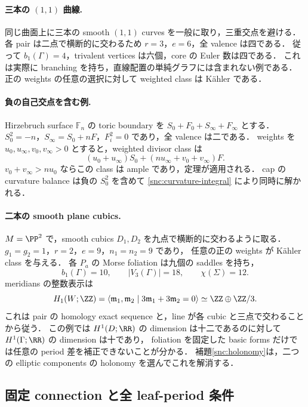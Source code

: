 \paragraph{三本の $(1,1)$ 曲線.}
同じ曲面上に三本の smooth $(1,1)$ curves を一般に取り，三重交点を避ける．
各 pair は二点で横断的に交わるため $r=3$，$e=6$，全 valence は四である．
従って $b_1(\Gamma)=4$，trivalent vertices は六個，core の Euler 数は四である．
これは実際に branching を持ち，直線配置の単純グラフには含まれない例である．
正の weights の任意の選択に対して weighted class は Kähler である．

\paragraph{負の自己交点を含む例.}
Hirzebruch surface $\mathbb F_n$ の toric boundary を
$S_0+F_0+S_\infty+F_\infty$ とする．
$S_0^2=-n$，$S_\infty=S_0+nF$，$F_i^2=0$ であり，全 valence は二である．
weights を $u_0,u_\infty,v_0,v_\infty>0$ とすると，weighted divisor class は
\[
 (u_0+u_\infty)S_0+(nu_\infty+v_0+v_\infty)F.
\]
$v_0+v_\infty>nu_0$ ならこの class は ample であり，定理が適用される．
cap の curvature balance は負の $S_0^2$ を含めて
\eqref{snc:curvature-integral} により同時に解かれる．


\paragraph{二本の smooth plane cubics.}
$M=\PP^2$ で，smooth cubics $D_1,D_2$ を九点で横断的に交わるように取る．
$g_1=g_2=1$，$r=2$，$e=9$，$n_1=n_2=9$ であり，
任意の正の weights が Kähler class を与える．
各 $P_a$ の Morse foliation は九個の saddles を持ち，
\[
 b_1(\Gamma)=10,\qquad |V_3(\Gamma)|=18,\qquad \chi(\Sigma)=12.
\]
meridians の整数表示は
\[
 H_1(W;\ZZ)=\langle \mathfrak m_1,\mathfrak m_2\mid
          3\mathfrak m_1+3\mathfrak m_2=0\rangle
     \simeq\ZZ\oplus\ZZ/3.
\]
これは pair の homology exact sequence と，line が各 cubic と三点で交わることから従う．
この例では $H^1(D;\RR)$ の dimension は十二であるのに対して
$H^1(\Gamma;\RR)$ の dimension は十であり，
foliation を固定した basic forms だけでは任意の period 差を補正できないことが分かる．
補題\ref{snc:holonomy}は，二つの elliptic components の holonomy を選んでこれを解消する．

\subsection{固定 connection と全 leaf-period 条件}

